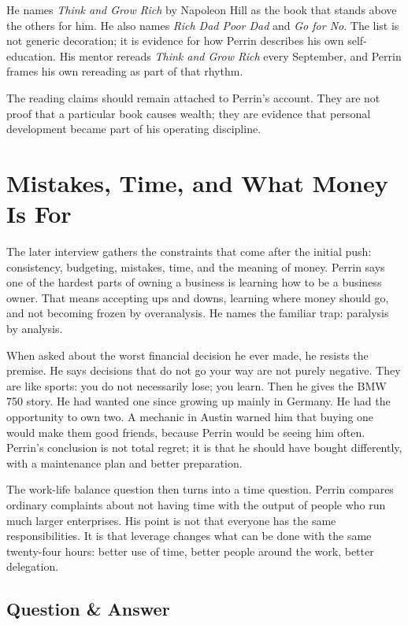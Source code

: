 He names \textit{Think and Grow Rich} by Napoleon Hill as the book that stands above the others for him. He also names \textit{Rich Dad Poor Dad} and \textit{Go for No}. The list is not generic decoration; it is evidence for how Perrin describes his own self-education. His mentor rereads \textit{Think and Grow Rich} every September, and Perrin frames his own rereading as part of that rhythm.

\begin{remark}
The reading claims should remain attached to Perrin's account. They are not proof that a particular book causes wealth; they are evidence that personal development became part of his operating discipline.
\end{remark}

\section{Mistakes, Time, and What Money Is For}

The later interview gathers the constraints that come after the initial push: consistency, budgeting, mistakes, time, and the meaning of money. Perrin says one of the hardest parts of owning a business is learning how to be a business owner. That means accepting ups and downs, learning where money should go, and not becoming frozen by overanalysis. He names the familiar trap: paralysis by analysis.

When asked about the worst financial decision he ever made, he resists the premise. He says decisions that do not go your way are not purely negative. They are like sports: you do not necessarily lose; you learn. Then he gives the BMW 750 story. He had wanted one since growing up mainly in Germany. He had the opportunity to own two. A mechanic in Austin warned him that buying one would make them good friends, because Perrin would be seeing him often. Perrin's conclusion is not total regret; it is that he should have bought differently, with a maintenance plan and better preparation.

The work-life balance question then turns into a time question. Perrin compares ordinary complaints about not having time with the output of people who run much larger enterprises. His point is not that everyone has the same responsibilities. It is that leverage changes what can be done with the same twenty-four hours: better use of time, better people around the work, better delegation.

\subsection{Question \& Answer}

